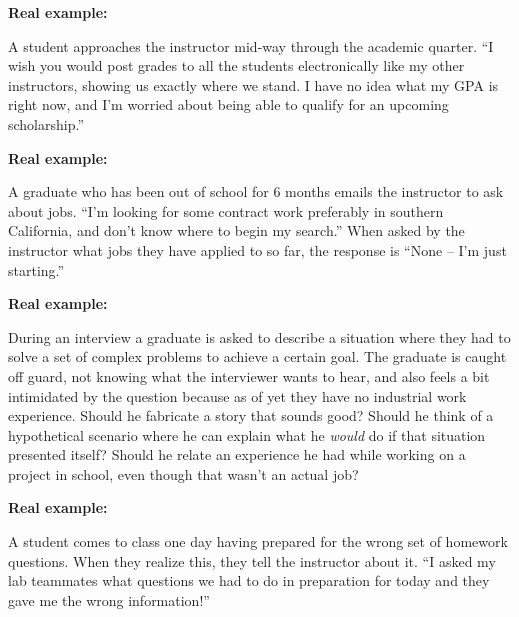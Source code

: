 \vfil \eject
\noindent
{\bf Real example:} 

A student approaches the instructor mid-way through the academic quarter.  ``I wish you would post grades to all the students electronically like my other instructors, showing us exactly where we stand.  I have no idea what my GPA is right now, and I'm worried about being able to qualify for an upcoming scholarship.''









\vfil \eject
\noindent
{\bf Real example:} 

A graduate who has been out of school for 6 months emails the instructor to ask about jobs.  ``I'm looking for some contract work preferably in southern California, and don't know where to begin my search.''  When asked by the instructor what jobs they have applied to so far, the response is ``None -- I'm just starting.''









\vfil \eject
\noindent
{\bf Real example:} 

During an interview a graduate is asked to describe a situation where they had to solve a set of complex problems to achieve a certain goal.  The graduate is caught off guard, not knowing what the interviewer wants to hear, and also feels a bit intimidated by the question because as of yet they have no industrial work experience.  Should he fabricate a story that sounds good?  Should he think of a hypothetical scenario where he can explain what he {\it would} do if that situation presented itself?  Should he relate an experience he had while working on a project in school, even though that wasn't an actual job?









\vfil \eject
\noindent
{\bf Real example:} 

A student comes to class one day having prepared for the wrong set of homework questions.  When they realize this, they tell the instructor about it.  ``I asked my lab teammates what questions we had to do in preparation for today and they gave me the wrong information!''










